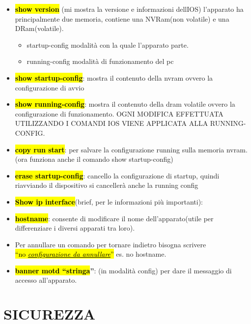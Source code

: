 \begin{itemize}
\item
  \textbf{\hl{show version}} (mi mostra la versione e informazioni
  dell\textquotesingle IOS) l'apparato ha principalmente due memoria,
  contiene una NVRam(non volatile) e una DRam(volatile).

  \begin{itemize}
  \item
    startup-config modalità con la quale l'apparato parte.
  \item
    running-config modalità di funzionamento del pc
  \end{itemize}
\item
  \textbf{\hl{show startup-config}}: mostra il contenuto della nvram
  ovvero la configurazione di avvio
\item
  \textbf{\hl{show running-config}}: mostra il contenuto della dram
  volatile ovvero la configurazione di funzionamento. OGNI MODIFICA
  EFFETTUATA UTILIZZANDO I COMANDI IOS VIENE APPLICATA ALLA
  RUNNING-CONFIG.
\item
  \textbf{\hl{copy run start}}: per salvare la configurazione running
  sulla memoria nvram.(ora funziona anche il comando show
  startup-config)
\item
  \textbf{\hl{erase startup-config}}: cancello la configurazione di
  startup, quindi riavviando il dispositivo si cancellerà anche la
  running config
\item
  \textbf{\hl{Show ip interface}}(brief, per le informazioni più
  importanti):
\item
  \textbf{\hl{hostname}}: consente di modificare il nome
  dell'apparato(utile per differenziare i diversi apparati tra loro).
\item
  Per annullare un comando per tornare indietro bisogna scrivere\\
  \hl{``no \emph{\ul{configurazione da annullare}}''} es. no hostname.
\item
  \textbf{\hl{banner motd ``stringa}''}: (in modalità config) per dare
  il messaggio di accesso all'apparato.
\end{itemize}

\subsubsection{}\label{section}

\section{SICUREZZA}\label{sicurezza}

